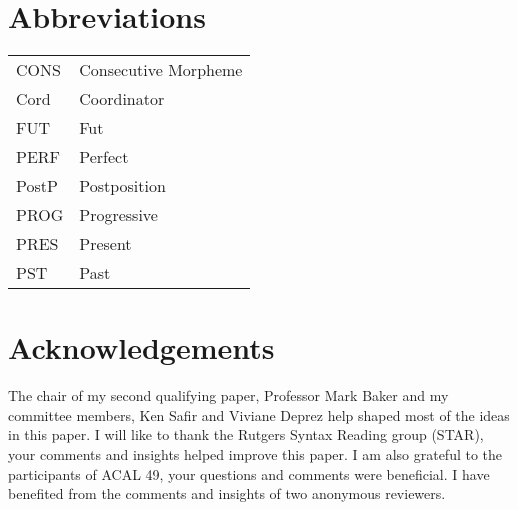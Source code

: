 \documentclass[output=paper,colorlinks,citecolor=brown]{langscibook}
\begin{document}
\section*{Abbreviations}

\begin{tabular}{@{}ll@{}} 
CONS  & Consecutive Morpheme  \\
Cord  & Coordinator \\
FUT   & Fut \\
PERF & Perfect \\
PostP & Postposition  \\
PROG  & Progressive \\
PRES  & Present  \\
PST   & Past \\
\end{tabular}


\section*{Acknowledgements}
The chair of my second qualifying paper, Professor Mark Baker and my committee members, Ken Safir and Viviane Deprez help shaped most of the ideas in this paper. I will like to thank the Rutgers Syntax Reading group (STAR), your comments and insights helped improve this paper. I am also grateful to the participants of ACAL 49, your questions and comments were beneficial. I have benefited from the comments and insights of two anonymous reviewers.

{\sloppy\printbibliography[heading=subbibliography,notkeyword=this]}
\end{document}
